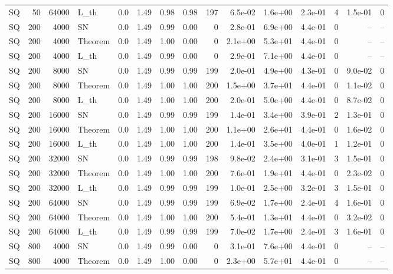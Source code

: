 \begin{tabular}{lrrlrrrrrrrrrrr}
SQ & 50 & 64000 & L\_th & 0.0 & 1.49 & 0.98 & 0.98 & 197 & 6.5e-02 & 1.6e+00 & 2.3e-01 & 4 & 1.5e-01 & 0 \\
SQ & 200 & 4000 & SN & 0.0 & 1.49 & 0.99 & 0.00 & 0 & 2.8e-01 & 6.9e+00 & 4.4e-01 & 0 & -- & -- \\
SQ & 200 & 4000 & Theorem & 0.0 & 1.49 & 1.00 & 0.00 & 0 & 2.1e+00 & 5.3e+01 & 4.4e-01 & 0 & -- & -- \\
SQ & 200 & 4000 & L\_th & 0.0 & 1.49 & 0.99 & 0.00 & 0 & 2.9e-01 & 7.1e+00 & 4.4e-01 & 0 & -- & -- \\
SQ & 200 & 8000 & SN & 0.0 & 1.49 & 0.99 & 0.99 & 199 & 2.0e-01 & 4.9e+00 & 4.3e-01 & 0 & 9.0e-02 & 0 \\
SQ & 200 & 8000 & Theorem & 0.0 & 1.49 & 1.00 & 1.00 & 200 & 1.5e+00 & 3.7e+01 & 4.4e-01 & 0 & 1.1e-02 & 0 \\
SQ & 200 & 8000 & L\_th & 0.0 & 1.49 & 1.00 & 1.00 & 200 & 2.0e-01 & 5.0e+00 & 4.4e-01 & 0 & 8.7e-02 & 0 \\
SQ & 200 & 16000 & SN & 0.0 & 1.49 & 0.99 & 0.99 & 199 & 1.4e-01 & 3.4e+00 & 3.9e-01 & 2 & 1.3e-01 & 0 \\
SQ & 200 & 16000 & Theorem & 0.0 & 1.49 & 1.00 & 1.00 & 200 & 1.1e+00 & 2.6e+01 & 4.4e-01 & 0 & 1.6e-02 & 0 \\
SQ & 200 & 16000 & L\_th & 0.0 & 1.49 & 1.00 & 1.00 & 200 & 1.4e-01 & 3.5e+00 & 4.0e-01 & 1 & 1.2e-01 & 0 \\
SQ & 200 & 32000 & SN & 0.0 & 1.49 & 0.99 & 0.99 & 198 & 9.8e-02 & 2.4e+00 & 3.1e-01 & 3 & 1.5e-01 & 0 \\
SQ & 200 & 32000 & Theorem & 0.0 & 1.49 & 1.00 & 1.00 & 200 & 7.6e-01 & 1.9e+01 & 4.4e-01 & 0 & 2.3e-02 & 0 \\
SQ & 200 & 32000 & L\_th & 0.0 & 1.49 & 0.99 & 0.99 & 199 & 1.0e-01 & 2.5e+00 & 3.2e-01 & 3 & 1.5e-01 & 0 \\
SQ & 200 & 64000 & SN & 0.0 & 1.49 & 0.99 & 0.99 & 199 & 6.9e-02 & 1.7e+00 & 2.4e-01 & 4 & 1.6e-01 & 0 \\
SQ & 200 & 64000 & Theorem & 0.0 & 1.49 & 1.00 & 1.00 & 200 & 5.4e-01 & 1.3e+01 & 4.4e-01 & 0 & 3.2e-02 & 0 \\
SQ & 200 & 64000 & L\_th & 0.0 & 1.49 & 0.99 & 0.99 & 199 & 7.0e-02 & 1.7e+00 & 2.4e-01 & 3 & 1.6e-01 & 0 \\
SQ & 800 & 4000 & SN & 0.0 & 1.49 & 0.99 & 0.00 & 0 & 3.1e-01 & 7.6e+00 & 4.4e-01 & 0 & -- & -- \\
SQ & 800 & 4000 & Theorem & 0.0 & 1.49 & 1.00 & 0.00 & 0 & 2.3e+00 & 5.7e+01 & 4.4e-01 & 0 & -- & -- \\

\end{tabular}
